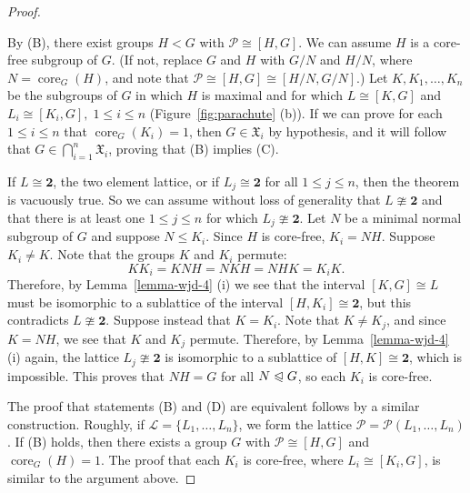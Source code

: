 \documentclass[11pt]{amsart}
\theoremstyle{plain}
\theoremstyle{definition}
\theoremstyle{remark}
\numberwithin{theorem}{section}
\numberwithin{claim}{section}
\numberwithin{equation}{section}
\numberwithin{conjecture}{section}
\newcommand{\<}{\ensuremath{\langle}}
\renewcommand{\>}{\ensuremath{\rangle}}
\renewcommand{\leq}{\ensuremath{\leqslant}}
\newcommand{\subnormal}{\ensuremath{\trianglelefteqslant}}
\newcommand{\core}{\ensuremath{\operatorname{core}}}
\newcommand{\0}{\ensuremath{\mathbf{0}}}
\newcommand{\1}{\ensuremath{\mathbf{1}}}
\newcommand{\2}{\ensuremath{\mathbf{2}}}
\newcommand{\3}{\ensuremath{\mathbf{3}}}
\newcommand{\4}{\ensuremath{\mathbf{4}}}
\newcommand{\5}{\ensuremath{\mathbf{5}}}
\newcommand{\sG}{\ensuremath{\mathfrak{X}}}
\newcommand{\sL}{\ensuremath{\mathscr{L}}}
\newcommand{\sP}{\ensuremath{\mathscr{P}}}
\begin{document}
\begin{proof}
\begin{figure}[centering]
\begin{center}
{
}
\end{center}
\end{figure}
By (B), there exist groups $H <G$ with $\sP \cong [H,G]$.  We can assume $H$
is a core-free subgroup of $G$.  (If not, replace $G$ and $H$ with
$G/N$ and $H/N$, where $N=\core_G(H)$, and note that 
$\sP \cong [H,G] \cong [H/N,G/N]$.)
Let $K, K_1, \dots, K_n$ be the subgroups of $G$ in which $H$ is maximal
and for which
$L \cong [K, G]$ and $L_i \cong [K_i, G],\; 1\leq i\leq n$ (Figure~\ref{fig:parachute} (b)).
If we can prove for each $1\leq i\leq n$ that $\core_G(K_i)=1$, then $G\in
\sG_i$ by hypothesis, and it will follow that $G \in \bigcap\limits_{i=1}^n
\sG_i$, proving that (B) implies (C). 

If $L \cong \2$, the two element lattice, or if $L_j\cong \2$ for all $1\leq
j\leq n$, then the theorem is vacuously true.  So we can assume without loss of
generality that $L\ncong \2$ and that there is at least one $1\leq j\leq n$ for which
$L_j\ncong \2$. Let $N$ be a minimal normal subgroup of $G$ and suppose $N\leq
K_i$.  Since $H$ is core-free, $K_i = NH$.  
Suppose $K_i \neq K$.
Note that the groups $K$ and $K_i$ permute:
\[
K K_i = K NH = NKH = NHK = K_i K.
\]
Therefore, by Lemma~\ref{lemma-wjd-4} (i) we see that the interval $[K,G] \cong L$
must be isomorphic to a sublattice of the interval $[H,K_i]\cong \2$, but this
contradicts $L\ncong \2$.
Suppose instead that $K = K_i$. Note that $K \neq K_j$, and since $K=NH$, we
see that $K$ and $K_j$ permute.  Therefore, by Lemma~\ref{lemma-wjd-4} (i)
again, the lattice $L_j\ncong \2$ is isomorphic to a sublattice of $[H,K]\cong
\2$, which is impossible.  This proves that $NH = G$ for all $N\subnormal G$, so
each $K_i$ is core-free. 

The proof that statements (B) and (D) are equivalent follows by a similar
construction.  Roughly, if
$\sL = \{L_1, \dots, L_n\}$, we form  the lattice $\sP = \sP(L_1, \dots, L_n)$.
If (B) holds, then there exists a group $G$ with $\sP \cong [H, G]$ and
$\core_G(H)=1$.  The proof that each $K_i$ is core-free, where $L_i\cong [K_i,G]$, is
similar to the argument above.
\end{proof}
\end{document}
